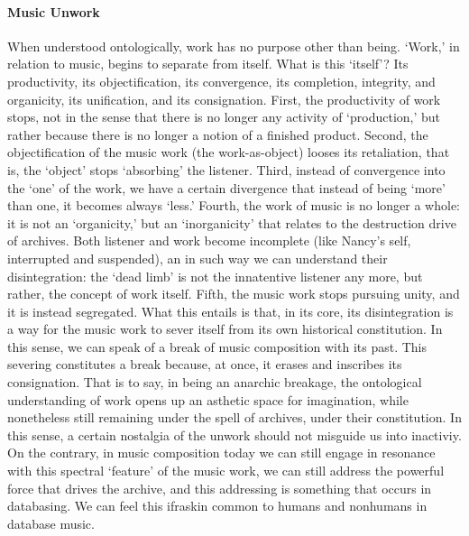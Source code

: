 \paragraph{Music Unwork}
When understood ontologically, work has no purpose other than being. `Work,' in relation to music, begins to separate from itself. What is this `itself'? Its productivity, its objectification, its convergence, its completion, integrity, and organicity, its unification, and its consignation. First, the productivity of work stops, not in the sense that there is no longer any activity of `production,' but rather because there is no longer a notion of a finished product. Second, the objectification of the music work (the work-as-object) looses its retaliation, that is, the `object' stops `absorbing' the listener. Third, instead of convergence into the `one' of the work, we have a certain divergence that instead of being `more' than one, it becomes always `less.' Fourth, the work of music is no longer a whole: it is not an `organicity,' but an `inorganicity' that relates to the destruction drive of archives. Both listener and work become incomplete (like Nancy's self, interrupted and suspended), an in such way we can understand their disintegration: the `dead limb' is not the innatentive listener any more, but rather, the concept of work itself. Fifth, the music work stops pursuing unity, and it is instead segregated. What this entails is that, in its core, its disintegration is a way for the music work to sever itself from its own historical constitution. In this sense, we can speak of a break of music composition with its past. This severing constitutes a break because, at once, it erases and inscribes its consignation. That is to say, in being an anarchic breakage, the ontological understanding of work opens up an asthetic space for imagination, while nonetheless still remaining under the spell of archives, under their constitution. In this sense, a certain nostalgia of the unwork should not misguide us into inactiviy. On the contrary, in music composition today we can still engage in resonance with this spectral `feature' of the music work, we can still address the powerful force that drives the archive, and this addressing is something that occurs in databasing. We can feel this ifraskin common to humans and nonhumans in database music. 



